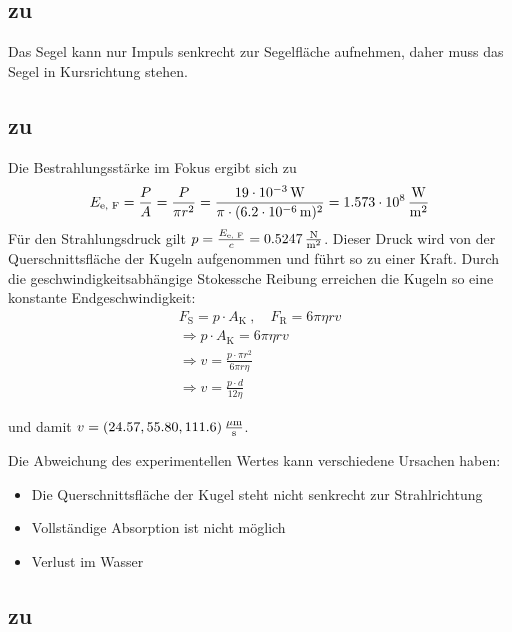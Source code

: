 \documentclass[a4paper]{scrartcl}
\begin{document}
\subsection{zu }
\label{lsg:Segelboot}
Das Segel kann nur Impuls senkrecht zur Segelfläche aufnehmen, daher muss das Segel in Kursrichtung stehen.

\subsection{zu }
\label{lsg:Strahlungsdruck}

Die Bestrahlungsstärke im Fokus ergibt sich zu
\begin{equation*}
  E_\text{e, F} =\frac{P}{A}= \frac{P }{\pi r^2} = \frac{\unit[19 \cdot 10^{-3}]{W}}{\pi\cdot (\unit[6.2\cdot 10^{-6}]{m})^2} = \unit[1.573 \cdot 10^8]{\frac{W}{m^2}}
\end{equation*}
Für den Strahlungsdruck gilt $p = \frac{E_\text{e, F}}{c} = \unit[0.5247]{\frac{N}{m^2}}$. Dieser Druck wird von der Querschnittsfläche der Kugeln aufgenommen und führt so zu einer Kraft. Durch die geschwindigkeitsabhängige Stokessche Reibung erreichen die Kugeln so eine konstante Endgeschwindigkeit:
\begin{align*}
  F_\text{S} = p\cdot A_\text{K}~,\quad F_\text{R}  = 6 \pi \eta r v  \\
  \Rightarrow p \cdot A_\text{K} = 6\pi \eta r v \\
  \Rightarrow v  = \frac{p \cdot \pi r^2}{6 \pi r \eta} \\
  \Rightarrow v  = \frac{p\cdot d}{12 \eta}
\end{align*}

und damit $v = \unit[(24.57, 55.80, 111.6)]{\frac{\mu m}{s}}$.

Die Abweichung des experimentellen Wertes kann verschiedene Ursachen haben:
\begin{itemize}[noitemsep]
  \item Die Querschnittsfläche der Kugel steht nicht senkrecht zur Strahlrichtung
  \item Vollständige Absorption ist nicht möglich
  \item Verlust im Wasser
\end{itemize}

\subsection{zu }
\label{lsg:ThermischeNeutronen}
\end{document}
